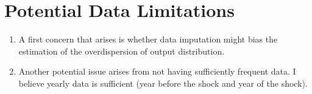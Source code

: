 \documentclass[american, abstract=on]{scrartcl}
\begin{document}
\section{Potential Data Limitations}

\begin{enumerate}
  \item A first concern that arises is whether data imputation might bias the estimation of the overdispersion of output distribution.
  \item Another potential issue arises from not having sufficiently frequent data. I believe yearly data is sufficient (year before the shock and year of the shock).
\end{enumerate}

\newpage
\printbibliography
\end{document}
